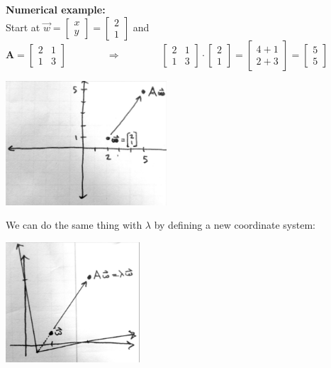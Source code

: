 \documentclass{article}
\newcommand{\ind}{\-\hspace{1cm}}
\begin{document}
\textbf{Numerical example:}\\
\ind Start at $\vec{w}=\begin{bmatrix} x \\ y \end{bmatrix}=\begin{bmatrix}2 \\ 1 \end{bmatrix} $ and $\mathbf{A} = \begin{bmatrix} 2 & 1 \\ 1 & 3 \end{bmatrix} \qquad \qquad  \Rightarrow  \qquad \qquad\begin{bmatrix} 2 & 1 \\ 1 & 3 \end{bmatrix} \cdot \begin{bmatrix}2 \\ 1 \end{bmatrix}  = \begin{bmatrix} 4+1 \\ 2+3 \end{bmatrix} =\begin{bmatrix}5 \\ 5 \end{bmatrix}$ 
\begin{center}
	\includegraphics[width=6cm]{figs/eigen2.pdf}
\end{center}
We can do the same thing with $\lambda$ by defining a new coordinate system:
\begin{center}
	\includegraphics[width=5cm]{figs/eigen3.pdf}
\end{center}
\end{document}
